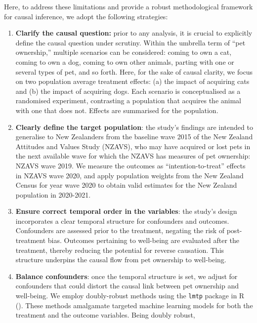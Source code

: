 \documentclass[
  singlecolumn]{article}
\begin{document}
Here, to address these limitations and provide a robust methodological
framework for causal inference, we adopt the following strategies:

\begin{enumerate}
\def\labelenumi{\arabic{enumi}.}
\item
  \textbf{Clarify the causal question:} prior to any analysis, it is
  crucial to explicitly define the causal question under scrutiny.
  Within the umbrella term of ``pet ownership,'' multiple scenarios can
  be considered: coming to own a cat, coming to own a dog, coming to own
  other animals, parting with one or several types of pet, and so forth.
  Here, for the sake of causal clarity, we focus on two population
  average treatment effects: (a) the impact of acquiring cats and (b)
  the impact of acquiring dogs. Each scenario is conceptualised as a
  randomised experiment, contrasting a population that acquires the
  animal with one that does not. Effects are summarised for the
  population.
\item
  \textbf{Clearly define the target population}: the study's findings
  are intended to generalise to New Zealanders from the baseline wave
  2015 of the New Zealand Attitudes and Values Study (NZAVS), who may
  have acquired or lost pets in the next available wave for which the
  NZAVS has measures of pet ownership: NZAVS wave 2019. We measure the
  outcomes as ``intention-to-treat'' effects in NZAVS wave 2020, and
  apply population weights from the New Zealand Census for year wave
  2020 to obtain valid estimates for the New Zealand population in
  2020-2021.
\item
  \textbf{Ensure correct temporal order in the variables}: the study's
  design incorporates a clear temporal structure for confounders and
  outcomes. Confounders are assessed prior to the treatment, negating
  the risk of post-treatment bias. Outcomes pertaining to well-being are
  evaluated after the treatment, thereby reducing the potential for
  reverse causation. This structure underpins the causal flow from pet
  ownership to well-being.
\item
  \textbf{Balance confounders}: once the temporal structure is set, we
  adjust for confounders that could distort the causal link between pet
  ownership and well-being. We employ doubly-robust methods using the
  \texttt{lmtp} package in R (). These methods amalgamate targeted machine learning models
  for both the treatment and the outcome variables. Being doubly robust,

\end{enumerate}
\end{document}

